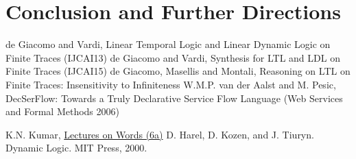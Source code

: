 \documentclass[11pt, oneside]{article}
\begin{document}



\section{Conclusion and Further Directions}

\begin{thebibliography}{9}
  de Giacomo and Vardi,
  Linear Temporal Logic and Linear Dynamic Logic on Finite Traces (IJCAI13)
  de Giacomo and Vardi, Synthesis for LTL and LDL on Finite Traces (IJCAI15)
  de Giacomo, Masellis and Montali, Reasoning on LTL on Finite Traces: Insensitivity to Infiniteness
    W.M.P. van der Aalst and M. Pesic, DecSerFlow: Towards a Truly Declarative Service Flow Language (Web Services and Formal Methods 2006)

  K.N. Kumar,
  \href{http://www.cmi.ac.in/~kumar/words/lecture06a.pdf}{Lectures on Words (6a)}
    D. Harel, D. Kozen, and J. Tiuryn. Dynamic Logic. MIT Press,
    2000.
\end{thebibliography}
\end{document}
